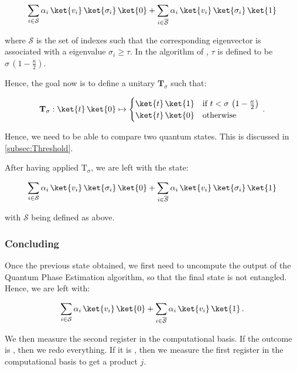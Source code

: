\documentclass[11pt, a4paper]{article}
\begin{document}
                \[\sum_{i\in\mathcal{S}}\alpha_i\,\ket{v_i}\,\ket{\sigma_i}\,\ket{0} + \sum_{i\in\overline{\mathcal{S}}}\alpha_i\,\ket{v_i}\,\ket{\sigma_i}\,\ket{1}\]
                
                where \(\mathcal{S}\) is the set of indexes such that the corresponding eigenvector is associated with a eigenvalue \(\sigma_i\geqslant\tau\). In the algorithm of \citeauthor{QRS}, \(\tau\) is defined to be \(\sigma\,\left(1-\frac\kappa2\right)\).
                
                Hence, the goal now is to define a unitary \(\mathbf{T}_\sigma\) such that:
                
                \[\mathbf{T}_\sigma:\ket{t}\,\ket{0}\mapsto\begin{cases}\ket{t}\,\ket{1} &\text{if } t < \sigma\,\left(1-\frac\kappa2\right)\\\ket{t}\,\ket{0}&\text{otherwise}\end{cases}\,.\]
                
                Hence, we need to be able to compare two quantum states. This is discussed in \autoref{subsec:Threshold}.
                
                After having applied \(\mathrm{T}_\sigma\), we are left with the state:
                
                \[\sum_{i\in\mathcal{S}}\alpha_i\,\ket{v_i}\,\ket{\sigma_i}\,\ket{0} + \sum_{i\in\overline{\mathcal{S}}}\alpha_i\,\ket{v_i}\,\ket{\sigma_i}\,\ket{1}\]
                
                with \(\mathcal{S}\) being defined as above.
            \subsubsection{Concluding}
                Once the previous state obtained, we first need to uncompute the output of the Quantum Phase Estimation algorithm, so that the final state is not entangled. Hence, we are left with:
                
                \[\sum_{i\in\mathcal{S}}\alpha_i\,\ket{v_i}\,\ket{0} + \sum_{i\in\overline{\mathcal{S}}}\alpha_i\,\ket{v_i}\,\ket{1}\,.\]
                
                We then measure the second register in the computational basis. If the outcome is , then we redo everything. If it is , then we measure the first register in the computational basis to get a product \(j\).
                
\end{document}
